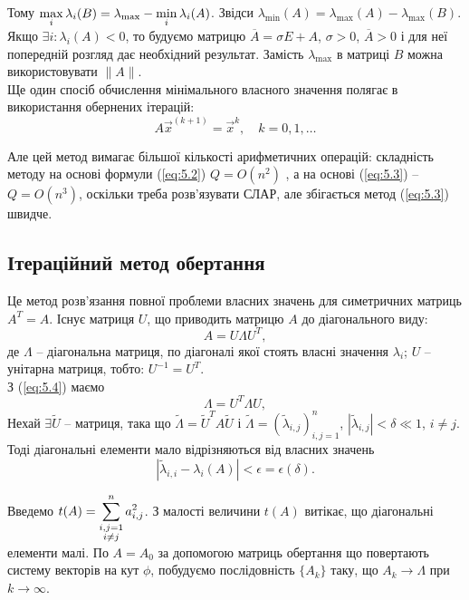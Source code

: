 \begin{enumerate}
	Тому $\displaystyle\max\limits_i \lambda_i (B) = \lambda_{\max} - \displaystyle\min\limits_i \lambda_i(A)$. Звідси $\lambda_{\min}(A) = \lambda_{\max}(A) - \lambda_{\max}(B)$. \\

	Якщо $\exists i: \lambda_i(A) < 0$, то будуємо матрицю $ \overline{A} = \sigma E + A$, $\sigma > 0$, $\overline{A} > 0$ і для неї попередній розгляд дає необхідний результат. Замість $\lambda_{\max}$ в матриці $B$ можна використовувати $\|A\|$. \\

	Ще один спосіб обчислення мінімального власного значення полягає в використання обернених ітерацій:
	\begin{equation}
		\label{eq:5.3}
		A \vec x^{(k+1)} = \vec x^k, \quad k = 0, 1, \ldots
	\end{equation}

	Але цей метод вимагає більшої кількості арифметичних операцій: складність методу на основі формули (\ref{eq:5.2}) $Q = O(n^2)$ , а на основі (\ref{eq:5.3}) -- $Q = O(n^3)$, оскільки треба розв'язувати СЛАР, але збігається метод (\ref{eq:5.3}) швидче.
\end{enumerate}

\subsection{Ітераційний метод обертання}
Це метод розв'язання повної проблеми власних значень для симетричних матриць $A^T = A$. Існує матриця $U$, що приводить матрицю $A$ до діагонального виду:
\begin{equation}
	\label{eq:5.4}
	A = U \Lambda U^T,
\end{equation}
де $\Lambda$ -- діагональна матриця, по діагоналі якої стоять власні значення $\lambda_i$; $U$ -- унітарна матриця, тобто: $U^{-1}=U^T$. \\

З (\ref{eq:5.4}) маємо
\begin{equation}
	\label{eq:5.5}
	\Lambda = U^T \Lambda U,
\end{equation}
Нехай $\exists \tilde U$ -- матриця, така що $\tilde \Lambda = \tilde U^T A \tilde U$ і $\tilde \Lambda = (\tilde \lambda_{i,j})_{i,j=1}^n$, $|\tilde \lambda_{i,j}| < \delta \ll 1$, $i \ne j$. \\

Тоді діагональні елементи мало відрізняються від власних значень \[ |\tilde \lambda_{i,i} - \lambda_i(A) | < \epsilon = \epsilon(\delta). \]

Введемо $t(A) = \displaystyle\sum\limits_{\substack{i, j = 1 \\ i \ne j}}^n a_{i,j}^2$. З малості величини $t(A)$ витікає, що діагональні елементи малі. По $A = A_0$ за допомогою матриць обертання %
що повертають систему векторів на кут $\phi$, побудуємо послідовність $\{A_k\}$ таку, що $A_k \to \Lambda$ при $k\to\infty$. \\

